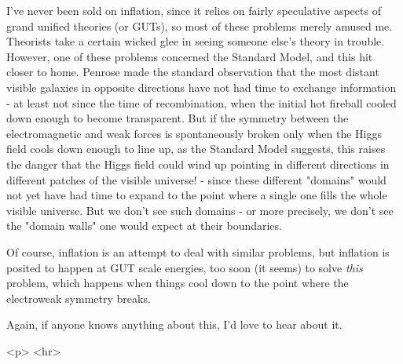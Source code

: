I've never been sold on inflation, since it relies on fairly speculative
aspects of grand unified theories (or GUTs), so most of these problems merely 
amused me.  Theorists take a certain wicked glee in seeing someone else's 
theory in trouble.  However, one of these problems concerned the Standard 
Model, and this hit closer to home.  Penrose made the standard observation 
that the most distant visible galaxies in opposite directions have not had 
time to exchange information - at least not since the time of recombination, 
when the initial hot fireball cooled down enough to become transparent.  
But if the symmetry between the electromagnetic and weak forces is 
spontaneously broken only when the Higgs field cools down enough to line 
up, as the Standard Model suggests, this raises the danger that the Higgs 
field could wind up pointing in different directions in different patches 
of the visible universe! - since these different "domains" would not yet 
have had time to expand to the point where a single one fills the whole 
visible universe.  But we don't see such domains - or more precisely, we 
don't see the "domain walls" one would expect at their boundaries.  

Of course, inflation is an attempt to deal with similar problems, but 
inflation is posited to happen at GUT scale energies, too soon (it seems)
to solve \emph{this} problem, which happens when things cool down to the 
point where the electroweak symmetry breaks.  

Again, if anyone knows anything about this, I'd love to hear about it.

<p> <hr>



